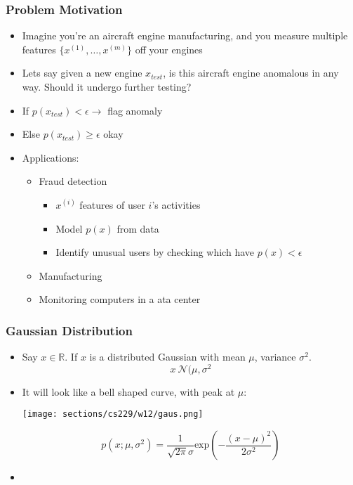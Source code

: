 \subsubsection{Problem Motivation}
\begin{itemize}[--]
	\item Imagine you're an aircraft engine manufacturing, and you measure multiple features $\{x^{(1)},\ldots ,x^{(m)} \}$ off your engines
	\item Lets say given a new engine $x_{test}$, is this aircraft engine anomalous in any way. Should it undergo further testing?
	\item If $p(x_{test}) < \epsilon\to$ flag anomaly
	\item Else $p(x_{test}) \geq\epsilon$ okay
	\item Applications:
	\begin{itemize}[--]
		\item Fraud detection
		\begin{itemize}[--]
			\item $x^{(i)}$ features of user $i$'s activities
			\item Model $p(x)$ from data
			\item Identify unusual users by checking which have $p(x) < \epsilon$
		\end{itemize}

		\item Manufacturing 
		\item Monitoring computers in a ata center
	\end{itemize}
\end{itemize}

\subsubsection{Gaussian Distribution}
\begin{itemize}[--]
	\item Say $x\in\mathbb{R}$. If $x$ is a distributed Gaussian with mean $\mu$, variance $\sigma^2$.
		$$x~\mathcal{N}(\mu, \sigma^2$$
	\item It will look like a bell shaped curve, with peak at $\mu$:
	\begin{center}
		\texttt{[image: sections/cs229/w12/gaus.png]}
	\end{center}
	$$p(x;\mu, \sigma^2)=\frac{1}{\sqrt{2\pi}\sigma} \text{exp}(-\frac{(x-\mu)^2}{2\sigma^2})$$

	\item 
\end{itemize}

